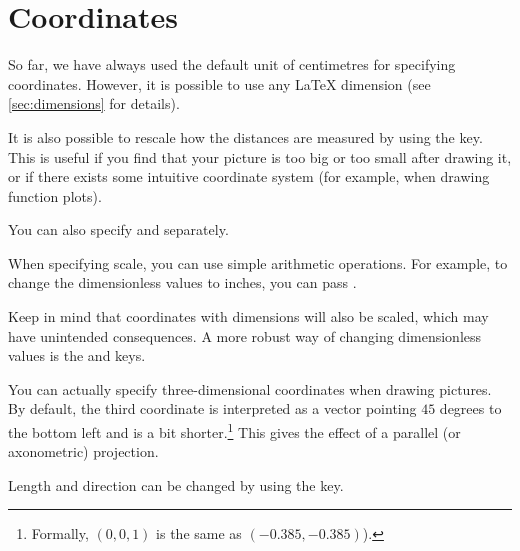 \section{Coordinates}

So far, we have always used the default unit of centimetres for specifying
coordinates. However, it is possible to use any \LaTeX{} dimension (see
\autoref{sec:dimensions} for details).
\begin{example}
\end{example}

It is also possible to rescale how the distances are measured by using the
 key. This is useful if you find that your picture is too big or
too small after drawing it, or if there exists some intuitive coordinate system
(for example, when drawing function plots).
\begin{example}
\end{example}
You can also specify  and  separately.

When specifying scale, you can use simple arithmetic operations. For example, to
change the dimensionless values to inches, you can pass .
\begin{example}
\end{example}
Keep in mind that coordinates with dimensions will also be scaled, which may
have unintended consequences. A more robust way of changing dimensionless
values is the  and  keys.
\begin{example}
\end{example}

You can actually specify three-dimensional coordinates when drawing pictures.
By default, the third coordinate is interpreted as a vector pointing \(45\)
degrees to the bottom left and is a bit shorter.\footnote{Formally,
\((0, 0, 1)\) is  the same as \((-0.385, -0.385)\)).}
This gives the effect of a parallel (or axonometric) projection.
\begin{example}[vertical_mode, examplewidth=0.85\linewidth]
\end{example}
Length and direction can be changed by using the  key. %

